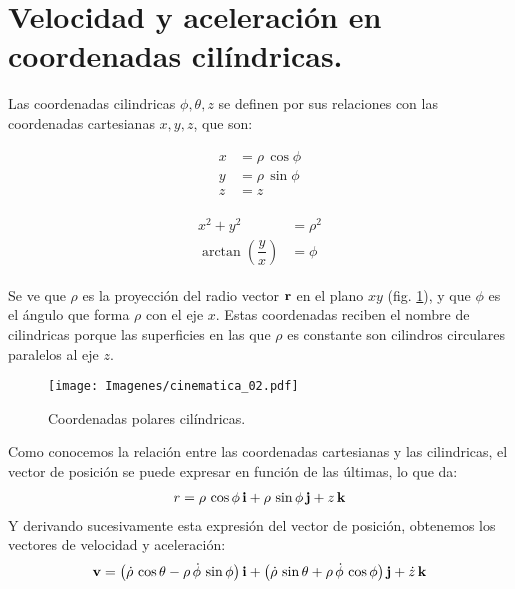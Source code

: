 \section{Velocidad y aceleración en coordenadas cilíndricas.}

Las coordenadas cilindricas $\phi, \theta, z$ se definen por sus relaciones con las coordenadas cartesianas $x, y, z$, que son:

\vspace*{-1cm}
\begin{center}
\begin{minipage}[t]{0.3\linewidth}
\begin{align*}
x &= \rho \, \cos \phi \\
y &= \rho \, \sin \phi \\
z &= z
\end{align*}
\end{minipage}
\begin{minipage}[t]{0.3\linewidth}
\begin{align}
\begin{aligned}
x^{2} + y^{2} &= \rho^{2} \\
\arctan \left( \dfrac{y}{x} \right) &= \phi
\end{aligned}
\label{eq:ecuacion_02_10}
\end{align}
\end{minipage}
\end{center}
Se ve que $\rho$ es la proyección del radio vector $\vb{r}$ en el plano $x y$ (fig. \ref{fig:figura_02_02}), y que $\phi$ es el ángulo que forma $\rho$ con el eje $x$. Estas coordenadas reciben el nombre de cilindricas porque las superficies en las que $\rho$ es constante son cilindros circulares paralelos al eje $z$.
\begin{figure}[H]
    \centering
    \texttt{[image: Imagenes/cinematica\_02.pdf]}
    \caption{Coordenadas polares cilíndricas.}
    \label{fig:figura_02_02}    
\end{figure}
Como conocemos la relación entre las coordenadas cartesianas y las cilindricas, el vector de posición se puede expresar en función de las últimas, lo que da:
\begin{align}
r = \rho \, \cos \phi \, \vb{i} + \rho \, \sin \phi \, \vb{j} + z \, \vb{k}
\label{eq:ecuacion_02_11} 
\end{align}
Y derivando sucesivamente esta expresión del vector de posición, obtenemos los vectores de velocidad y aceleración:
\begin{align}
\vb{v} = \left( \dot{\rho} \, \cos \theta - \rho \, \dot{\phi} \, \sin \phi \right) \vb{i} + \left( \dot{\rho} \, \sin \theta + \rho \, \dot{\phi} \, \cos \phi \right) \vb{j} + \dot{z} \, \vb{k}
\label{eq:ecuacion_02_12}
\end{align}
